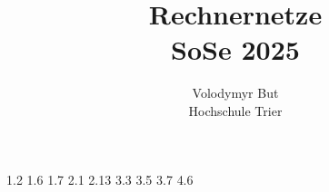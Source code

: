 \documentclass[10pt, oneside]{article}
\title{Rechnernetze\\[10pt]\Large{SoSe 2025}}
\author{Volodymyr But\\[10pt]Hochschule Trier}
\date{}
\begin{document}
\maketitle
\vspace{25px}

{1.2}
{1.6}
{1.7}
{2.1}
{2.13}
{3.3}
{3.5}
\pagebreak
{3.7}
{4.6}
\end{document}
